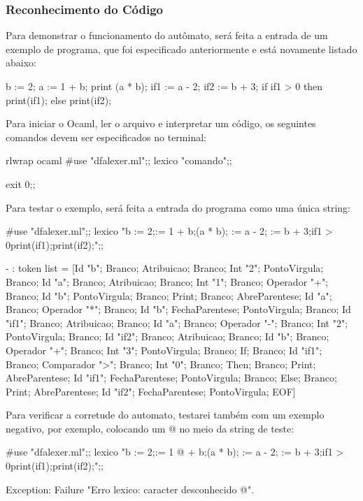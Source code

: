 \documentclass[12pt,a4paper,twoside]{report}
\begin{document}
\subsubsection{Reconhecimento do Código}
Para demonstrar o funcionamento do autômato, será feita a entrada de um exemplo de programa, que foi especificado anteriormente e está novamente listado abaixo:

\begin{terminal}
b := 2;
a := 1 + b;
print (a * b);
if1 := a - 2;
if2 := b + 3;
if if1 > 0
then print(if1);
else print(if2);
\end{terminal}

Para iniciar o Ocaml, ler o arquivo e interpretar um código, os seguintes comandos devem ser especificados no terminal:
\begin{terminal}
rlwrap ocaml
#use "dfalexer.ml";;
lexico "comando";;

exit 0;;
\end{terminal}

Para testar o exemplo, será feita a entrada do programa como uma única string:
\begin{terminal}
#use "dfalexer.ml";;
lexico "b := 2;\na := 1 + b;\nprint (a * b); := a - 2; := b + 3;\nif if1 > 0\nthen print(if1);\nelse print(if2);";;

- : token list =
[Id "b"; Branco; Atribuicao; Branco; Int "2"; PontoVirgula; Branco; Id "a";
 Branco; Atribuicao; Branco; Int "1"; Branco; Operador "+"; Branco; Id "b";
 PontoVirgula; Branco; Print; Branco; AbreParentese; Id "a"; Branco;
 Operador "*"; Branco; Id "b"; FechaParentese; PontoVirgula; Branco;
 Id "if1"; Branco; Atribuicao; Branco; Id "a"; Branco; Operador "-"; Branco;
 Int "2"; PontoVirgula; Branco; Id "if2"; Branco; Atribuicao; Branco;
 Id "b"; Branco; Operador "+"; Branco; Int "3"; PontoVirgula; Branco; If;
 Branco; Id "if1"; Branco; Comparador ">"; Branco; Int "0"; Branco; Then;
 Branco; Print; AbreParentese; Id "if1"; FechaParentese; PontoVirgula;
 Branco; Else; Branco; Print; AbreParentese; Id "if2"; FechaParentese;
 PontoVirgula; EOF]
\end{terminal}

Para verificar a corretude do automato, testarei também com um exemplo negativo, por exemplo, colocando um @ no meio da string de teste:

\begin{terminal}
#use "dfalexer.ml";;
lexico "b := 2;\na := 1 @ + b;\nprint (a * b); := a - 2; := b + 3;\nif if1 > 0\nthen print(if1);\nelse print(if2);";;

Exception: Failure "Erro lexico: caracter desconhecido @".
\end{terminal}
\end{document}
